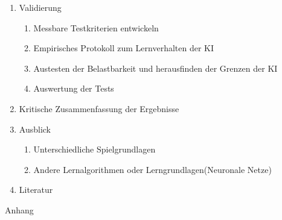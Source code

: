 \documentclass[12pt,a4paper]{scrartcl}
\begin{document}
\begin{enumerate}
	\item Validierung
	\begin{enumerate}
		\item Messbare Testkriterien entwickeln
		\item Empirisches Protokoll zum Lernverhalten der KI
		\item Austesten der Belastbarkeit und herausfinden der Grenzen der KI
		\item Auswertung der Tests
	\end{enumerate}
	
	\item Kritische Zusammenfassung der Ergebnisse

	\item Ausblick
	\begin{enumerate}
		\item Unterschiedliche Spielgrundlagen
		\item Andere Lernalgorithmen oder Lerngrundlagen(Neuronale Netze)
	\end{enumerate}			
	
	\item Literatur	
\end{enumerate}
Anhang


\nocite{*}
\printbibliography
\end{document}
